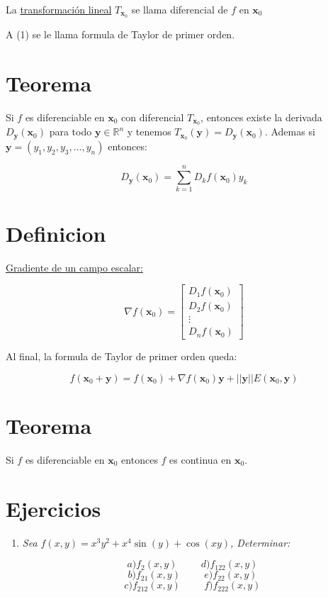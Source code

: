 \documentclass[12pt]{article}
\newcommand{\teorema}{\section{Teorema}}
\newcommand{\definicion}{\section{Definicion}}
\newcommand{\ejercicios}{\section{Ejercicios}}
\newcommand{\Rn}[1]{\mathbb{R}^{#1}}
\newcommand{\vecti}[2]{\textbf{#1}_{#2}}
\begin{document}
	La \underline{transformación lineal} $T_{\vecti{x}{0}}$ se llama diferencial de $f$ en $\vecti{x}{0}$
	
	\bigskip 
	
	A (1) se le llama formula de Taylor de primer orden.
	
	\teorema
	
	Si $f$ es diferenciable en $\vecti{x}{0}$ con diferencial $T_{\vecti{x}{0}}$, entonces existe la derivada $D_{\textbf{y}}(\vecti{x}{0})$ para todo $\textbf{y} \in \Rn{n}$ y tenemos $T_{\vecti{x}{0}}(\textbf{y}) = D_{\textbf{y}}(\vecti{x}{0})$. Ademas si $\textbf{y} = (y_1,y_2,y_3,\dots,y_n)$ entonces:
	
	$$ D_{\textbf{y}}(\vecti{x}{0}) = \sum_{k=1}^{n}D_k f(\vecti{x}{0})y_k $$
	
	\definicion
	
	\underline{Gradiente de un campo escalar:}
	
	$$ \nabla f (\vecti{x}{0}) = \begin{bmatrix}
		D_1 f (\vecti{x}{0}) \\
		D_2 f (\vecti{x}{0}) \\
		\vdots \\
		D_n f (\vecti{x}{0})
	\end{bmatrix} $$
	
	Al final, la formula de Taylor de primer orden queda:
	
	$$ f(\vecti{x}{0} + \textbf{y}) = f(\vecti{x}{0}) + \nabla f (\vecti{x}{0}) \textbf{y} + ||\textbf{y}||E(\vecti{x}{0} , \textbf{y}) $$
	
	\teorema
	
	Si $f$ es diferenciable en $\vecti{x}{0}$ entonces $f$ es continua en $\vecti{x}{0}$.
	
	\ejercicios
	
	\begin{enumerate}
		\item \textit{Sea $f(x,y) = x^3y^2 + x^4 \sin (y) + \cos (xy)$, Determinar:}
		
		$$ a) f_2(x,y) \hspace{1cm} d) f_{122}(x,y) $$
		$$ b) f_{21}(x,y) \hspace{1cm} e) f_{22}(x,y) $$
		$$ c) f_{212}(x,y) \hspace{1cm} f) f_{222}(x,y)$$
	\end{enumerate}
	
\end{document}

